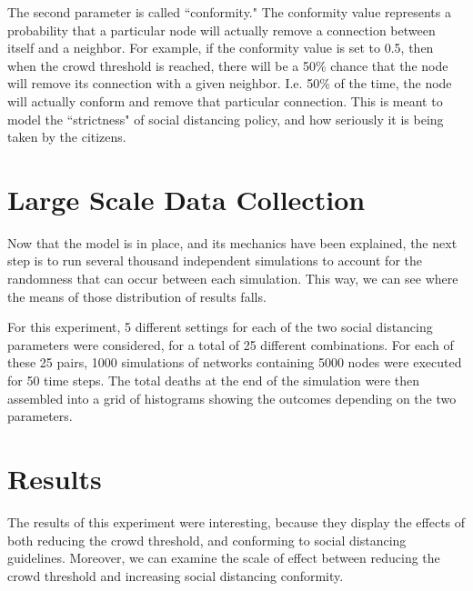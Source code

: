 \documentclass[12pt]{article}
\begin{document}
\begin{multicols}{2}
The second parameter is called ``conformity."
The conformity value represents a probability that a particular node will actually remove a connection between itself and a neighbor. For example, if the conformity value is set to 0.5, then when the crowd threshold is reached, there will be a 50\% chance that the node will remove its connection with a given neighbor.
I.e. 50\% of the time, the node will actually conform and remove that particular connection.
This is meant to model the ``strictness" of social distancing policy, and how seriously it is being taken by the citizens.

\section{Large Scale Data Collection}
\label{data}
Now that the model is in place, and its mechanics have been explained, the next step is to run several thousand independent simulations to account for the randomness that can occur between each simulation.
This way, we can see where the means of those distribution of results falls.

For this experiment, 5 different settings for each of the two social distancing parameters were considered, for a total of 25 different combinations.
For each of these 25 pairs, 1000 simulations of networks containing 5000 nodes were executed for 50 time steps.
The total deaths at the end of the simulation were then assembled into a grid of histograms showing the outcomes depending on the two parameters.

\section{Results}
The results of this experiment were interesting, because they display the effects of both reducing the crowd threshold, and conforming to social distancing guidelines.
Moreover, we can examine the scale of effect between reducing the crowd threshold and increasing social distancing conformity.


\end{multicols}
\end{document}
